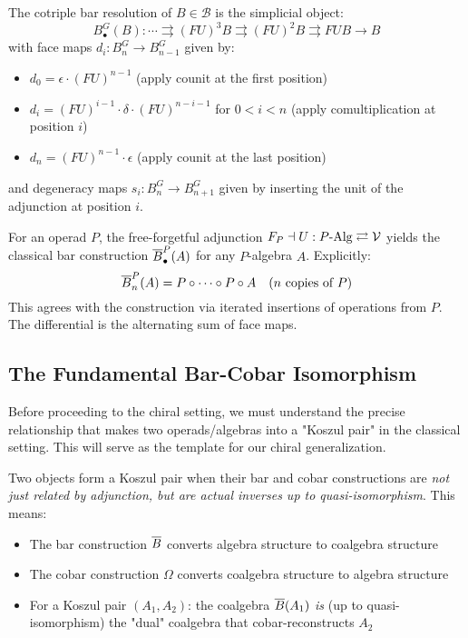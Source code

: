 \begin{example}
\begin{definition}
The cotriple bar resolution of $B \in \mathcal{B}$ is the simplicial object:
\[
B^G_\bullet(B) : \cdots \rightrightarrows (FU)^3B \rightrightarrows (FU)^2B \rightrightarrows FUB \to B
\]
with face maps $d_i : B^G_n \to B^G_{n-1}$ given by:
\begin{itemize}
\item $d_0 = \epsilon \cdot (FU)^{n-1}$ (apply counit at the first position)
\item $d_i = (FU)^{i-1} \cdot \delta \cdot (FU)^{n-i-1}$ for $0 < i < n$ (apply comultiplication at position $i$)  
\item $d_n = (FU)^{n-1} \cdot \epsilon$ (apply counit at the last position)
\end{itemize}
and degeneracy maps $s_i : B^G_n \to B^G_{n+1}$ given by inserting the unit of the adjunction at position $i$.
\end{definition}
 
\begin{example}
For an operad $P$, the free-forgetful adjunction $F_P \dashv U : P\text{-Alg} \rightleftarrows \mathcal{V}$ yields the classical bar construction $\overline{B}^P_\bullet(A)$ for any $P$-algebra $A$. Explicitly:
\[
\overline{B}^P_n(A) = P \circ \cdots \circ P \circ A \quad \text{($n$ copies of $P$)}
\]
This agrees with the construction via iterated insertions of operations from $P$. The differential is the alternating sum of face maps.
\end{example}
 
\subsection{The Fundamental Bar-Cobar Isomorphism}

Before proceeding to the chiral setting, we must understand the precise relationship that makes two operads/algebras into a "Koszul pair" in the classical setting. This will serve as the template for our chiral generalization.

\begin{principle}
Two objects form a Koszul pair when their bar and cobar constructions are \emph{not just related by adjunction, but are actual inverses up to quasi-isomorphism}. This means:

\begin{itemize}
\item The bar construction $\overline{B}$ converts algebra structure to coalgebra structure
\item The cobar construction $\Omega$ converts coalgebra structure to algebra structure  
\item For a Koszul pair $(A_1, A_2)$: the coalgebra $\overline{B}(A_1)$ \emph{is} (up to quasi-isomorphism) the "dual" coalgebra that cobar-reconstructs $A_2$
\end{itemize}


\end{principle}
\end{example}
